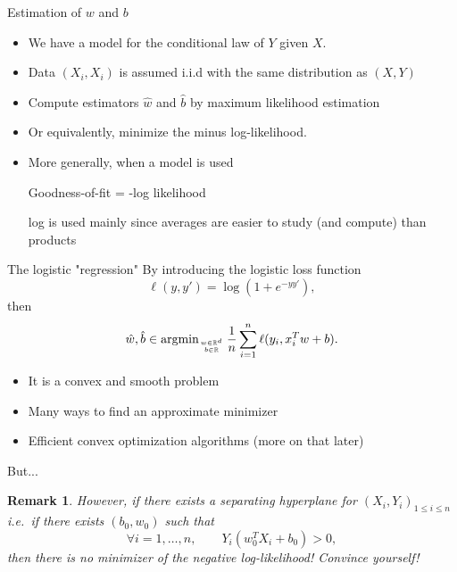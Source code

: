 \documentclass[xcolor={usenames,dvipsnames},handout]{beamer}
\newtheorem{remark}[theorem]{Remark}
\begin{document}
\begin{frame}{Estimation of $w$ and $b$}

\begin{itemize}
\item We have a model for the conditional law of $Y$ given $X$.
\item Data $(X_i , X_i)$ is assumed i.i.d with the same distribution as $(X,Y)$
\item Compute estimators $\hat{w}$ and $\hat{b}$ by maximum likelihood estimation
\item Or equivalently, minimize the minus log-likelihood.
\item  More generally, when a model is used
\begin{center}
Goodness-of-fit = -log likelihood
\end{center}
log is used mainly since averages are easier to study (and compute) than products
\end{itemize}  
\end{frame}


\begin{frame}{The logistic "regression"}
By introducing the logistic loss function
$$
\ell (y , y') = \log (1+e^{-yy'} ),
$$
then
$$
\hat{w}, \hat{b} \in \operatorname{argmin}_{w\in \mathbb{R}^d \atop b \in \mathbb{R}} \frac{1}{n} \sum_{i=1}^n \ell (y_i , x_i^T w+b).
$$

\begin{itemize}
\item It is a convex and smooth problem
\item Many ways to find an approximate minimizer 
\item Efficient convex optimization algorithms (more on that later)
\end{itemize}
\end{frame}

\begin{frame}{But...}
\begin{remark}
However, if there exists a separating hyperplane for $(X_i,Y_i)_{1\leq i \leq n}$ i.e.\ if there exists $(b_0,w_0)$ such that
$$
\forall i=1,\hdots , n , \qquad Y_i (w_0^T X_i +b_0) >0,
$$
then there is no minimizer of the negative log-likelihood! Convince yourself! 
\end{remark}
\end{frame}
\end{document}
